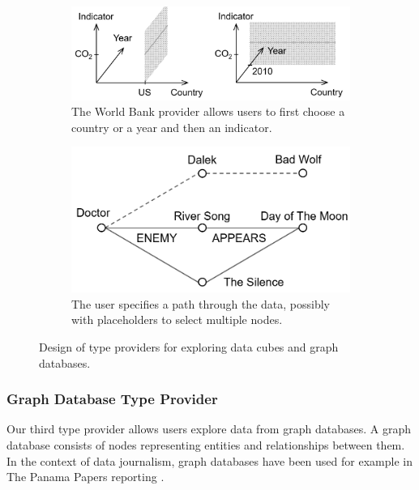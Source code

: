 \documentclass[manuscript,review,anonymous]{acmart}
\begin{document}
\begin{figure}
\centering
\begin{subfigure}[b]{0.5\textwidth}
  \centering
  \includegraphics[scale=0.25]{figures/cubetp}
  \vspace{0.5em}
  \caption{The World Bank provider allows users to first choose
    a country or a year and then an indicator.}
  \label{fig:cubetp}
\end{subfigure}
\hfill
\begin{subfigure}[b]{0.45\textwidth}
  \centering
  \includegraphics[scale=0.28]{figures/graphtp}
  \caption{The user specifies a path through the data, possibly with
    placeholders to select multiple nodes.}
  \label{fig:graphtp}
\end{subfigure}
\vspace{-0.5em}
\caption{Design of type providers for exploring data cubes and graph databases.}
\label{fig:three graphs}
\end{figure}


\subsubsection*{Graph Database Type Provider}
Our third type provider allows users explore data from graph databases. A graph database
consists of nodes representing entities and relationships between them. In the context of
data journalism, graph databases have been used for example in The Panama Papers reporting \cite{panama}.
\end{document}
